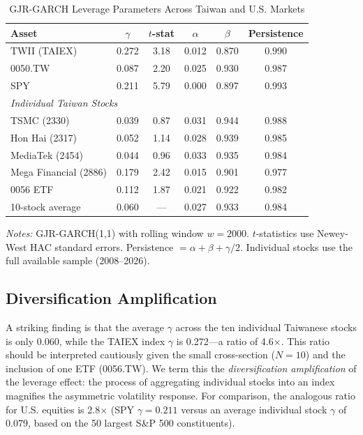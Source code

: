 \begin{table}[H]
\centering
\caption{GJR-GARCH Leverage Parameters Across Taiwan and U.S. Markets}
\label{tab:gamma}
\begin{tabular}{lccccc}
\toprule
Asset & $\gamma$ & $t$-stat & $\alpha$ & $\beta$ & Persistence \\
\midrule
TWII (TAIEX) & 0.272 & 3.18 & 0.012 & 0.870 & 0.990 \\
0050.TW & 0.087 & 2.20 & 0.025 & 0.930 & 0.987 \\
SPY & 0.211 & 5.79 & 0.000 & 0.897 & 0.993 \\
\midrule
\multicolumn{6}{l}{\textit{Individual Taiwan Stocks}} \\
TSMC (2330) & 0.039 & 0.87 & 0.031 & 0.944 & 0.988 \\
Hon Hai (2317) & 0.052 & 1.14 & 0.028 & 0.939 & 0.985 \\
MediaTek (2454) & 0.044 & 0.96 & 0.033 & 0.935 & 0.984 \\
Mega Financial (2886) & 0.179 & 2.42 & 0.015 & 0.901 & 0.977 \\
0056 ETF & 0.112 & 1.87 & 0.021 & 0.922 & 0.982 \\
10-stock average & 0.060 & --- & 0.027 & 0.933 & 0.984 \\
\bottomrule
\end{tabular}
\begin{flushleft}
\small \textit{Notes:} GJR-GARCH(1,1) with rolling window $w = 2000$. $t$-statistics use Newey-West HAC standard errors. Persistence $= \alpha + \beta + \gamma/2$. Individual stocks use the full available sample (2008--2026).
\end{flushleft}
\end{table}

\subsection{Diversification Amplification}

A striking finding is that the average $\gamma$ across the ten individual Taiwanese stocks is only 0.060, while the TAIEX index $\gamma$ is 0.272---a ratio of 4.6$\times$. This ratio should be interpreted cautiously given the small cross-section ($N = 10$) and the inclusion of one ETF (0056.TW). We term this the \textit{diversification amplification} of the leverage effect: the process of aggregating individual stocks into an index magnifies the asymmetric volatility response. For comparison, the analogous ratio for U.S. equities is 2.8$\times$ (SPY $\gamma = 0.211$ versus an average individual stock $\gamma$ of 0.079, based on the 50 largest S\&P 500 constituents).

